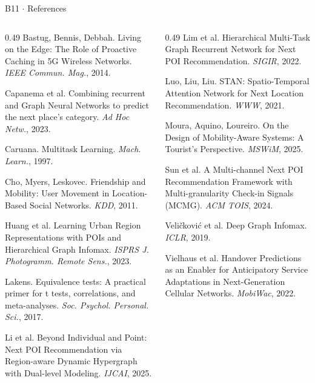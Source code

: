 \documentclass{beamer}
\begin{document}
\begin{frame}{B11 $\cdot$ References}
    \vspace{0pt}%
    \scriptsize
    \setlength{\parskip}{0.6ex}
    \begin{columns}[T,onlytextwidth]
    \begin{column}{0.49\textwidth}
    Bastug, Bennis, Debbah. Living on the Edge: The Role of Proactive Caching in 5G Wireless
    Networks. \emph{IEEE Commun. Mag.}, 2014.\par
    Capanema et al. Combining recurrent and Graph Neural Networks to predict the next place's
    category. \emph{Ad Hoc Netw.}, 2023.\par
    Caruana. Multitask Learning. \emph{Mach. Learn.}, 1997.\par
    Cho, Myers, Leskovec. Friendship and Mobility: User Movement in Location-Based Social Networks.
    \emph{KDD}, 2011.\par
    Huang et al. Learning Urban Region Representations with POIs and Hierarchical Graph Infomax.
    \emph{ISPRS J. Photogramm. Remote Sens.}, 2023.\par
    Lakens. Equivalence tests: A practical primer for t tests, correlations, and meta-analyses.
    \emph{Soc. Psychol. Personal. Sci.}, 2017.\par
    Li et al. Beyond Individual and Point: Next POI Recommendation via Region-aware Dynamic
    Hypergraph with Dual-level Modeling. \emph{IJCAI}, 2025.\par
    \end{column}
    \hfill
    \begin{column}{0.49\textwidth}
    Lim et al. Hierarchical Multi-Task Graph Recurrent Network for Next POI Recommendation.
    \emph{SIGIR}, 2022.\par
    Luo, Liu, Liu. STAN: Spatio-Temporal Attention Network for Next Location Recommendation.
    \emph{WWW}, 2021.\par
    Moura, Aquino, Loureiro. On the Design of Mobility-Aware Systems: A Tourist's Perspective.
    \emph{MSWiM}, 2025.\par
    Sun et al. A Multi-channel Next POI Recommendation Framework with Multi-granularity Check-in
    Signals (MCMG). \emph{ACM TOIS}, 2024.\par
    Veličković et al. Deep Graph Infomax. \emph{ICLR}, 2019.\par
    Vielhaus et al. Handover Predictions as an Enabler for Anticipatory Service Adaptations in
    Next-Generation Cellular Networks. \emph{MobiWac}, 2022.\par
    \end{column}
    \end{columns}
\end{frame}
\end{document}
